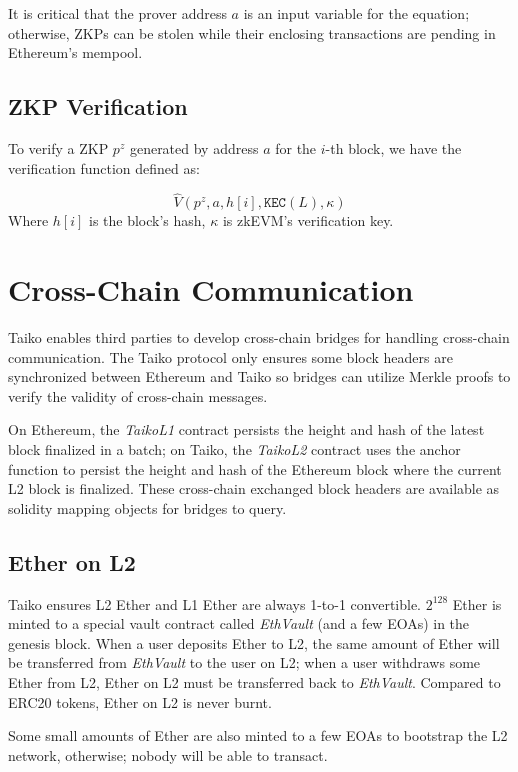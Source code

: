 \documentclass[9pt,oneside]{amsart}
\begin{document}
\begin{multicols}{2}
It is critical that the prover address $a$ is an input variable for the equation; otherwise, ZKPs can be stolen while their enclosing transactions are pending in Ethereum's mempool.

\subsection{ZKP Verification} To verify a ZKP $p^z$ generated by address $a$ for the $i$-th block, we have the verification function defined as:

\begin{equation}
    \hat{V}(p^z, a, h[i], \texttt{KEC}(L), \kappa)
\end{equation}
Where $h[i]$ is the block's hash, $\kappa$ is  zkEVM's verification key.

\section{Cross-Chain Communication}
Taiko enables third parties to develop cross-chain bridges for handling cross-chain communication. The Taiko protocol only ensures some block headers are synchronized between Ethereum and Taiko so bridges can utilize Merkle proofs to verify the validity of cross-chain messages.

On Ethereum, the \textit{TaikoL1} contract persists the height and hash of the latest block finalized in a batch; on Taiko, the \textit{TaikoL2} contract uses the anchor function to persist the height and hash of the Ethereum block where the current L2 block is finalized. These cross-chain exchanged block headers are available as solidity mapping objects for bridges to query.

\subsection{Ether on L2}
Taiko ensures L2 Ether and L1 Ether are always 1-to-1 convertible. $2^128$ Ether is minted to a special vault contract called \textit{EthVault} (and a few EOAs) in the genesis block. When a user deposits Ether to L2, the same amount of Ether will be transferred from \textit{EthVault} to the user on L2; when a user withdraws some Ether from L2, Ether on L2 must be transferred back to \textit{EthVault}. Compared to ERC20 tokens, Ether on L2 is never burnt.

Some small amounts of Ether are also minted to a few EOAs to bootstrap the L2 network, otherwise; nobody will be able to transact.

\end{multicols}
\end{document}

